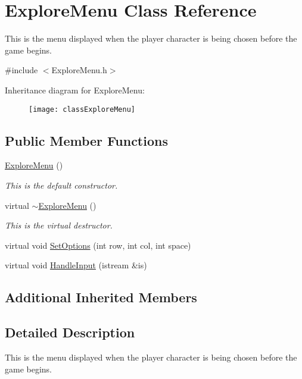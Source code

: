 \hypertarget{classExploreMenu}{\section{Explore\-Menu Class Reference}
\label{classExploreMenu}
}


This is the menu displayed when the player character is being chosen before the game begins.  




{\ttfamily \#include $<$Explore\-Menu.\-h$>$}

Inheritance diagram for Explore\-Menu\-:\begin{figure}[H]
\begin{center}
\leavevmode
\texttt{[image: classExploreMenu]}
\end{center}
\end{figure}
\subsection*{Public Member Functions}
\begin{DoxyCompactItemize}
\item 
\hyperlink{classExploreMenu_ac05a4f8e2972f1617a702e04677f241b}{Explore\-Menu} ()
\begin{DoxyCompactList}\small\item\em This is the default constructor. \end{DoxyCompactList}\item 
virtual \hyperlink{classExploreMenu_ade9d89c5b19679f01b73120120022e68}{$\sim$\-Explore\-Menu} ()
\begin{DoxyCompactList}\small\item\em This is the virtual destructor. \end{DoxyCompactList}\item 
virtual void \hyperlink{classExploreMenu_a01fdbb56ef495290e825ec9a57ecd2b6}{Set\-Options} (int row, int col, int space)
\item 
virtual void \hyperlink{classExploreMenu_aa75a9fcba679d683855d3188f1fc3505}{Handle\-Input} (istream \&is)
\end{DoxyCompactItemize}
\subsection*{Additional Inherited Members}


\subsection{Detailed Description}
This is the menu displayed when the player character is being chosen before the game begins. 

